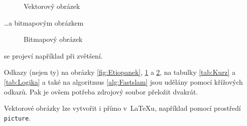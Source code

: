 \documentclass[11pt, a4paper]{article}
\begin{document}
\begin{figure}[h]
		\centering
		\caption{Vektorový obrázek}
		\label{fig:Vektor}
\end{figure}
\bigskip
\noindent \dots a bitmapovým obrázkem
\begin{figure}[h]
		\centering
		\caption{Bitmapový obrázek}
		\label{fig:Bitmap}
\end{figure}
\bigskip

\noindent se projeví například při zvětšení.

Odkazy (nejen ty) na obrázky \ref{fig:Etiopanek}, \ref{fig:Vektor} a \ref{fig:Bitmap}, na  
tabulky \ref{tab:Kurz} a \ref{tab:Logika} a také na algoritmus \ref{alg:Fastslam} jsou udělány pomocí 
křížových odkazů. Pak je ovšem potřeba zdrojový soubor přeložit dvakrát.

Vektorové obrázky lze vytvořit i přímo v~\LaTeX u, například pomocí prostředí\texttt{ picture}.
\end{document}
